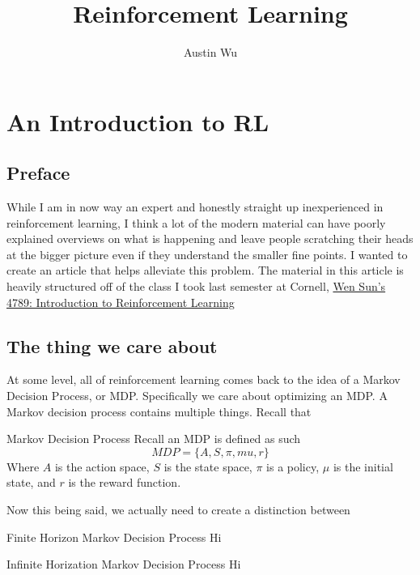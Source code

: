 \documentclass[]{report}
\title{Reinforcement Learning}
\author{Austin Wu}
\begin{document}
  \maketitle
  \tableofcontents{}
  \newpage
  \chapter{An Introduction to RL}
  \section{Preface}
  While I am in now way an expert and honestly straight up inexperienced in reinforcement learning, I think a lot of the modern material can have poorly explained overviews on what is happening and leave people scratching their heads at the bigger picture even if they understand the smaller fine points. I wanted to create an article that helps alleviate this problem. The material in this article is heavily structured off of the class I took last semester at Cornell, \href{https://wensun.github.io/CS4789_spring_2025.html}{Wen Sun's 4789: Introduction to Reinforcement Learning}

  \section{The thing we care about}

  At some level, all of reinforcement learning comes back to the idea of a Markov Decision Process, or MDP. Specifically we care about optimizing an MDP. A Markov decision process contains multiple things. Recall that 
  \begin{definition}{Markov Decision Process}
    Recall an MDP is defined as such 
    \begin{equation}
      MDP = \{A, S, \pi, mu, r\}
    \end{equation}
    Where $A$ is the action space, $S$ is the state space, $\pi$ is a policy, $\mu$ is the initial state, and $r$ is the reward function.
    
  \end{definition}
  Now this being said, we actually need to create a distinction between

  \begin{definition}{Finite Horizon Markov Decision Process}
    Hi
  \end{definition}

  \begin{definition}{Infinite Horization Markov Decision Process}
    Hi
  \end{definition}
\end{document}
